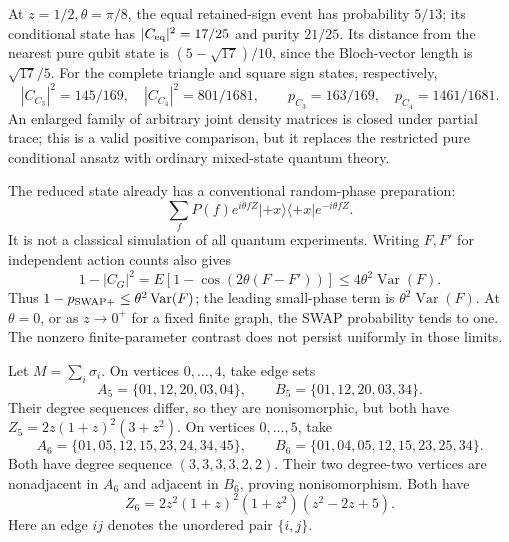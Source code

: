 At \(z=1/2,\theta=\pi/8\), the equal retained-sign event has probability
\(5/13\); its conditional state has \(|C_{\rm eq}|^2=17/25\) and
purity \(21/25\).  Its distance from the nearest pure qubit state is
\((5-\sqrt{17})/10\), since the Bloch-vector length is \(\sqrt{17}/5\).
For the complete triangle and square sign states, respectively,
\[
 |C_{C_3}|^2=145/169,\quad |C_{C_4}|^2=801/1681,\qquad
 p_{C_3}=163/169,\quad p_{C_4}=1461/1681.
\]
An enlarged family of arbitrary joint density matrices is closed under
partial trace; this is a valid positive comparison, but it replaces
the restricted pure conditional ansatz with ordinary mixed-state
quantum theory.

The reduced state already has a conventional random-phase preparation:
\[
 \sum_fP(f)e^{i\theta fZ}|+\!x\rangle\langle+\!x|e^{-i\theta fZ}.
\]
It is not a classical simulation of all quantum experiments.
Writing \(F,F'\) for independent action counts also gives
\[
 1-|C_G|^2=E[1-\cos(2\theta(F-F'))]
 \le4\theta^2\operatorname{Var}(F).
\]
Thus \(1-p_{\rm SWAP+}\le\theta^2\operatorname{Var}(F)\);
the leading small-phase term is
\(\theta^2\operatorname{Var}(F)\).
At \(\theta=0\), or as \(z\to0^+\) for a fixed finite graph, the
SWAP probability tends to one.  The nonzero finite-parameter contrast
does not persist uniformly in those limits.

\begin{example}
\label{fin:graph-aliases}
Let \(M=\sum_i\sigma_i\).
On vertices \(0,\ldots,4\), take edge sets
\[
 A_5=\{01,12,20,03,04\},\qquad
 B_5=\{01,12,20,03,34\}.
\]
Their degree sequences differ, so they are nonisomorphic, but
both have \(Z_5=2z(1+z)^2(3+z^2)\).
On vertices \(0,\ldots,5\), take
\[
 A_6=\{01,05,12,15,23,24,34,45\},\qquad
 B_6=\{01,04,05,12,15,23,25,34\}.
\]
Both have degree sequence \((3,3,3,3,2,2)\).
Their two degree-two vertices are nonadjacent in \(A_6\) and adjacent
in \(B_6\), proving nonisomorphism.  Both have
\[
 Z_6=2z^2(1+z)^2(1+z^2)(z^2-2z+5).
\]
Here an edge \(ij\) denotes the unordered pair \(\{i,j\}\).
\end{example}

